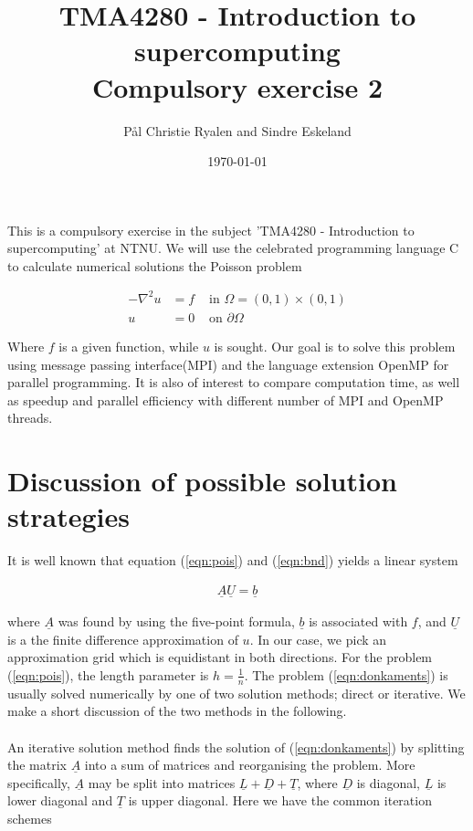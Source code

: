 \documentclass{article}
\title{TMA4280 - Introduction to supercomputing \\
\large{Compulsory exercise 2}}
\author{Pål Christie Ryalen and Sindre Eskeland}
\date{\today}
\begin{document}
\maketitle



This is a compulsory exercise in the subject 'TMA4280 - Introduction to supercomputing' at NTNU. We will use the celebrated programming language C to calculate numerical solutions the Poisson problem

\begin{align}
    -\nabla^2 u & = f 	&\text{ in } \Omega = (0,1) \times (0,1)  \label{eqn:pois}\\ 
 u & = 0 			&\text{ on } \partial \Omega \label{eqn:bnd}
\end{align}

Where $f$ is a given function, while $u$ is sought. Our goal is to solve this problem using message passing interface(MPI) and the language extension OpenMP for parallel programming.  It is also of interest to compare computation time, as well as speedup and parallel efficiency with different number of MPI and OpenMP threads.




\section{Discussion of possible solution strategies} \label{sec:strat}

It is well known that equation (\ref{eqn:pois}) and (\ref{eqn:bnd}) yields a linear system

\begin{align}
    \underline{A}\underline{U} = \underline{b} \label{eqn:donkaments}
\end{align}

where $\underline{A}$ was found by using the five-point formula, $\underline{b}$ is associated with $f$, and $\underline{U}$ is a the finite difference approximation of $u$. In our case, we pick an approximation grid which is equidistant in both directions. For the problem (\ref{eqn:pois}), the length parameter is $h = \frac{1}{n}$. The problem (\ref{eqn:donkaments}) is usually solved numerically by one of two solution methods; direct or iterative. We make a short discussion of the two methods in the following.
\
\\
\\
An iterative solution method finds the solution of (\ref{eqn:donkaments}) by splitting the matrix $\underline{A}$ into a sum of matrices and reorganising the problem. More specifically, $\underline{A}$ may be split into matrices $\underline{L} + \underline{D} + \underline{T}$, where $\underline{D}$ is diagonal, $\underline{L}$ is lower diagonal and $\underline{T}$ is upper diagonal. Here we have the common iteration schemes
\end{document}

